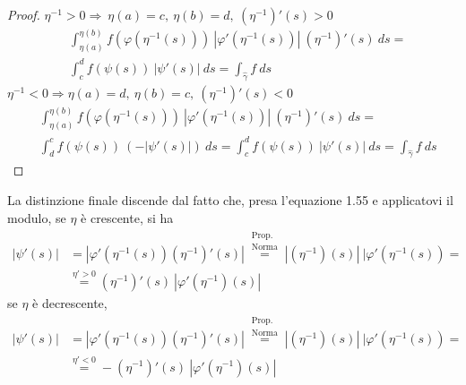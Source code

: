 \begin{proof}
        \indent$\eta^{-1}>0 \Rightarrow \ \eta(a)=c,\  \eta(b)=d,\  (\eta^{-1})'(s)>0$
        \begin{equation*}
            \begin{aligned}
                &\int_{\eta(a)}^{\eta(b)}{f(\varphi(\eta^{-1}(s)))\ |\varphi'(\eta^{-1}(s))| \ (\eta^{-1})'(s)\ ds}=\\
                &\int_{c}^{d}{f(\psi(s))\ |\psi'(s)| \ ds}= \int_{\hat{\gamma}}{f \ ds}
            \end{aligned}
        \end{equation*}
        \indent$\eta^{-1}<0 \Rightarrow \eta(a)=d, \ \eta(b)=c, \ (\eta^{-1})'(s)<0$
        \begin{equation*}
            \begin{aligned}
                &\int_{\eta(a)}^{\eta(b)}{f(\varphi(\eta^{-1}(s)))\ |\varphi'(\eta^{-1}(s))| \ (\eta^{-1})'(s)\ ds}=\\
                &\int_{d}^{c}{f(\psi(s))\ (-|\psi'(s)|)\ ds} = \int_{c}^{d}{f(\psi(s))\ |\psi'(s)|\ ds}= \int_{\hat{\gamma}}{f\ ds}
            \end{aligned}
        \end{equation*}
    \end{proof}
    \begin{oss}
        La distinzione finale discende dal fatto che, presa l'equazione 1.55 e applicatovi il modulo, se $\eta$ è crescente, si ha
        \begin{equation*}
            \begin{aligned}
                |\psi'(s)|&=|\varphi'(\eta^{-1}(s))(\eta^{-1})'(s)|\overset{\substack{\text{Prop.}\\\text{Norma}}}{=}|(\eta^{-1})(s)|\ |\varphi'(\eta^{-1}(s))=\\
                &\overset{\eta'>0}{=} (\eta^{-1})'(s)\ |\varphi'(\eta^{-1})(s)|
            \end{aligned}
        \end{equation*}
        se $\eta$ è decrescente,
        \begin{equation*}
            \begin{aligned}
                |\psi'(s)|&=|\varphi'(\eta^{-1}(s))(\eta^{-1})'(s)|\overset{\substack{\text{Prop.}\\\text{Norma}}}{=}|(\eta^{-1})(s)|\ |\varphi'(\eta^{-1}(s))=\\
                &\overset{\eta'<0}{=} -(\eta^{-1})'(s)\ |\varphi'(\eta^{-1})(s)|
            \end{aligned}
        \end{equation*}
    \end{oss}
